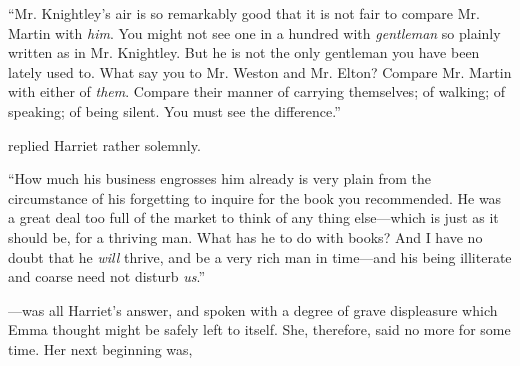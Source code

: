 
“Mr. Knightley's air is so remarkably good that it is not fair to compare Mr. Martin with {\em him}. You might not see one in a hundred with {\em gentleman} so plainly written as in Mr. Knightley. But he is not the only gentleman you have been lately used to. What say you to Mr. Weston and Mr. Elton? Compare Mr. Martin with either of {\em them}. Compare their manner of carrying themselves; of walking; of speaking; of being silent. You must see the difference.”



 replied Harriet rather solemnly.



“How much his business engrosses him already is very plain from the circumstance of his forgetting to inquire for the book you recommended. He was a great deal too full of the market to think of any thing else---which is just as it should be, for a thriving man. What has he to do with books? And I have no doubt that he {\em will} thrive, and be a very rich man in time---and his being illiterate and coarse need not disturb {\em us}.”

---was all Harriet's answer, and spoken with a degree of grave displeasure which Emma thought might be safely left to itself. She, therefore, said no more for some time. Her next beginning was,

